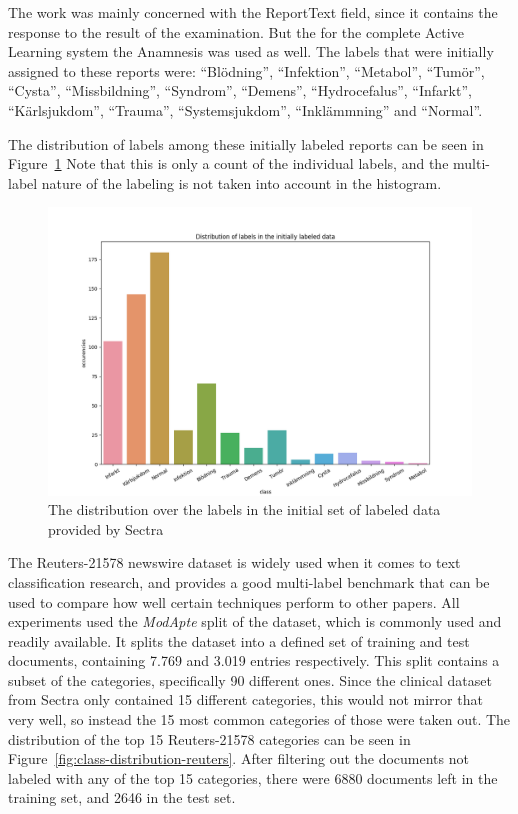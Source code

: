 The work was mainly concerned with the ReportText field, since it contains the response to the result of the examination.
But the for the complete Active Learning system the Anamnesis was used as well.
The labels that were initially assigned to these reports were:
``Blödning'', ``Infektion'', ``Metabol'', ``Tumör'', ``Cysta'', ``Missbildning'', ``Syndrom'', ``Demens'', ``Hydrocefalus'', ``Infarkt'', ``Kärlsjukdom'', ``Trauma'', ``Systemsjukdom'', ``Inklämmning'' and ``Normal''.

The distribution of labels among these initially labeled reports can be seen in Figure~\ref{fig:class-distribution}
Note that this is only a count of the individual labels, and the multi-label nature of the labeling is not taken into account in the histogram.

\begin{figure}
    \includegraphics[scale=0.5]{figures/class-distribution.png}
    \caption{The distribution over the labels in the initial set of labeled data provided by Sectra}
    \label{fig:class-distribution}
\end{figure}

The Reuters-21578 newswire dataset is widely used when it comes to text classification research, and provides a good multi-label benchmark that can be used to compare how well certain techniques perform to other papers.
All experiments used the \textit{ModApte} split of the dataset, which is commonly used and readily available. %
It splits the dataset into a defined set of training and test documents, containing 7.769 and 3.019 entries respectively.
This split contains a subset of the categories, specifically 90 different ones.
Since the clinical dataset from Sectra only contained 15 different categories, this would not mirror that very well, so instead the 15 most common categories of those were taken out.
The distribution of the top 15 Reuters-21578 categories can be seen in Figure~\ref{fig:class-distribution-reuters}.
After filtering out the documents not labeled with any of the top 15 categories, there were 6880 documents left in the training set, and 2646 in the test set.

